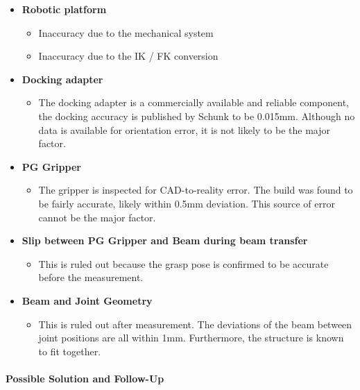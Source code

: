 \begin{itemize}
	\item \textbf{Robotic platform}

\begin{itemize}
	\item Inaccuracy due to the mechanical system

	\item Inaccuracy due to the IK / FK conversion

\end{itemize}
	\item \textbf{Docking adapter}

\begin{itemize}
	\item The docking adapter is a commercially available and reliable component, the docking accuracy is published by Schunk to be 0.015mm. Although no data is available for orientation error, it is not likely to be the major factor.

\end{itemize}
    \item\textbf{PG Gripper}

\begin{itemize}
	\item The gripper is inspected for CAD-to-reality error. The build was found to be fairly accurate, likely within 0.5mm deviation. This source of error cannot be the major factor.

\end{itemize}
    \item\textbf{Slip between PG Gripper and Beam during beam transfer}

\begin{itemize}
	\item This is ruled out because the grasp pose is confirmed to be accurate before the measurement.

\end{itemize}
    \item\textbf{Beam and Joint Geometry}

\begin{itemize}
	\item This is ruled out after measurement. The deviations of the beam between joint positions are all within 1mm. Furthermore, the structure is known to fit together.

\end{itemize}
\end{itemize}

\paragraph{Possible Solution and Follow-Up}

